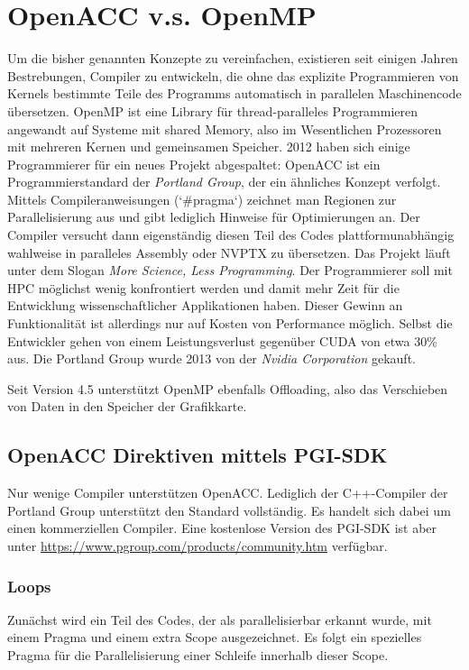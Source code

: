 	\chapter{OpenACC v.s. OpenMP}
	Um die bisher genannten Konzepte zu vereinfachen, existieren seit einigen Jahren Bestrebungen, Compiler zu entwickeln, die ohne das explizite Programmieren von \Glspl{Kernel} bestimmte Teile des Programms automatisch in parallelen Maschinencode übersetzen. OpenMP ist eine Library für thread-paralleles Programmieren angewandt auf Systeme mit shared Memory, also im Wesentlichen Prozessoren mit mehreren Kernen und gemeinsamen Speicher. 2012 haben sich einige Programmierer für ein neues Projekt abgespaltet: OpenACC ist ein Programmierstandard der \textit{Portland Group}, der ein ähnliches Konzept verfolgt. Mittels Compileranweisungen (\li`#pragma`) zeichnet man Regionen zur Parallelisierung aus und gibt lediglich Hinweise für Optimierungen an. Der Compiler versucht dann eigenständig diesen Teil des Codes plattformunabhängig wahlweise in paralleles Assembly oder \Gls{NVPTX} zu übersetzen. Das Projekt läuft unter dem Slogan \textit{More Science, Less Programming}. Der Programmierer soll mit HPC möglichst wenig konfrontiert werden und damit mehr Zeit für die Entwicklung wissenschaftlicher Applikationen haben. Dieser Gewinn an Funktionalität ist allerdings nur auf Kosten von Performance möglich. Selbst die Entwickler gehen von einem Leistungsverlust gegenüber CUDA von etwa 30\% aus. Die Portland Group wurde 2013 von der \textit{Nvidia Corporation} gekauft.
	
	Seit Version 4.5 unterstützt OpenMP ebenfalls Offloading, also das Verschieben von Daten in den Speicher der Grafikkarte.
	 
		\section{OpenACC Direktiven mittels PGI-SDK}
		Nur wenige Compiler unterstützen OpenACC. Lediglich der C++-Compiler der Portland Group unterstützt den Standard vollständig. Es handelt sich dabei um einen kommerziellen Compiler. Eine kostenlose Version des PGI-SDK ist aber unter \url{https://www.pgroup.com/products/community.htm} verfügbar.
		
			\subsection{Loops}
			Zunächst wird ein Teil des Codes, der als parallelisierbar erkannt wurde, mit einem Pragma und einem extra Scope ausgezeichnet. Es folgt ein spezielles Pragma für die Parallelisierung einer Schleife innerhalb dieser Scope. 
			
